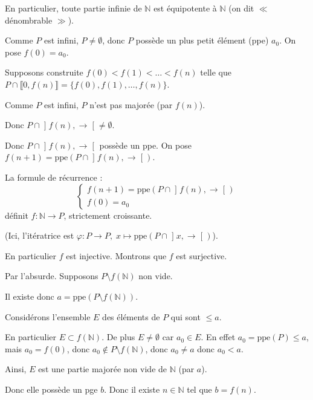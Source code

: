 \documentclass[a4paper,11pt]{article}
\newcommand{\N}{\mathbb{N}}
\begin{document}
\begin{remarque}
    En particulier, toute partie infinie de $\N$ est équipotente à $\N$ (on dit $\ll$ dénombrable $\gg$).
\end{remarque}

\begin{demonstration}
    Comme $P$ est infini, $P \neq \emptyset$, donc $P$ possède un plus petit élément (ppe) $a_0$. 
    On pose $f(0) = a_0$.
    
    Supposons construite $f(0) < f(1) < \dots < f(n)$ telle que $P \cap \llbracket 0, f(n) \rrbracket = \{f(0), f(1), \dots, f(n)\}$.
    
    Comme $P$ est infini, $P$ n'est pas majorée (par $f(n)$).
    
    Donc $P \cap \mathopen{]} f(n), \to \mathclose{[} \neq \emptyset$.
    
    Donc $P \cap \mathopen{]} f(n), \to \mathclose{[}$ possède un ppe. On pose $f(n+1) = \text{ppe} \left(P \cap \mathopen{]} f(n), \to \mathclose{[} \right)$.
    
    La formule de récurrence :
    \[
    \begin{cases} 
    f(n+1) = \text{ppe} \left(P \cap \mathopen{]} f(n), \to \mathclose{[} \right) \\[1em]
    f(0) = a_0
    \end{cases}
    \]
    définit $f : \N \to P$, strictement croissante.
    
    (Ici, l'itératrice est $\varphi : P \to P, \; x \mapsto \text{ppe} \left(P \cap \mathopen{]} x, \to \mathclose{[} \right)$).
    
    \vspace{10pt}
    En particulier $f$ est injective. Montrons que $f$ est surjective.
    
    Par l'absurde. Supposons $P \setminus f(\N)$ non vide.
    
    Il existe donc $a = \text{ppe} \left(P \setminus f(\N) \right)$.
    
    Considérons l'ensemble $E$ des éléments de $P$ qui sont $\le a$.
    
    En particulier $E \subset f(\N)$.
    De plus $E \neq \emptyset$ car $a_0 \in E$. 
    En effet $a_0 = \text{ppe}(P) \le a$, mais $a_0 = f(0)$, donc $a_0 \notin P \setminus f(\N)$, donc $a_0 \neq a$ donc $a_0 < a$.
    
    Ainsi, $E$ est une partie majorée non vide de $\N$ (par $a$).
    
    Donc elle possède un pge $b$. Donc il existe $n \in \N$ tel que $b = f(n)$.
    

\end{demonstration}
\end{document}
